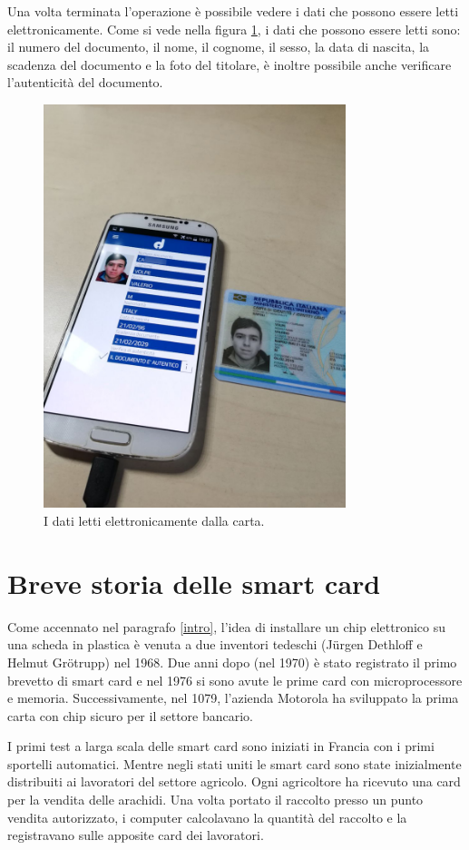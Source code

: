 Una volta terminata l'operazione è possibile vedere i dati che possono essere letti elettronicamente. Come si vede nella figura \ref{fig:carta_letta}, i dati che possono essere letti sono: il numero del documento, il nome, il cognome, il sesso, la data di nascita, la scadenza del documento e la foto del titolare, è inoltre possibile anche verificare l'autenticità del documento.

\begin{figure}[h!]
  \centering
  \includegraphics[width=250pt]{pictures/carta_letta.jpg}
  \caption{I dati letti elettronicamente dalla carta.}
  \label{fig:carta_letta}
\end{figure}

\section{Breve storia delle smart card}
Come accennato nel paragrafo \ref{intro}, l'idea di installare un chip elettronico su una scheda in plastica è venuta a due inventori tedeschi (Jürgen Dethloff e Helmut Grötrupp) nel 1968. Due anni dopo (nel 1970) è stato registrato il primo brevetto di smart card e nel 1976 si sono avute le prime card con microprocessore e memoria. Successivamente, nel 1079, l'azienda Motorola ha sviluppato la prima carta con chip sicuro per il settore bancario.

I primi test a larga scala delle smart card sono iniziati in Francia con i primi sportelli automatici. Mentre negli stati uniti le smart card sono state inizialmente distribuiti ai lavoratori del settore agricolo. Ogni agricoltore ha ricevuto una card per la vendita delle arachidi. Una volta portato il raccolto presso un punto vendita autorizzato, i computer calcolavano la quantità del raccolto e la registravano sulle apposite card dei lavoratori.

